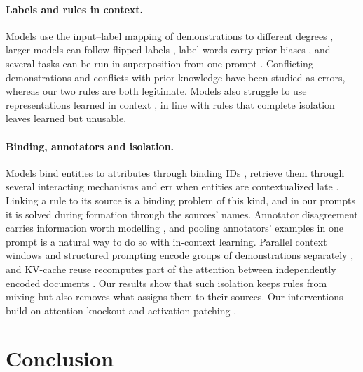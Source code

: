 \documentclass[11pt]{article}
\begin{document}
\paragraph{Labels and rules in context.}
Models use the input--label mapping of demonstrations to different degrees \citep{min-etal-2022-rethinking,kossen2024incontext}, larger models can follow flipped labels \citep{wei2023larger}, label words carry prior biases \citep{zhao2021calibrate}, and several tasks can be run in superposition from one prompt \citep{xiong2024everything,li-etal-2024-language,yang2026localizingtaskrecognitiontask}.
Conflicting demonstrations \citep{jiao2026understandingdynamicsdemonstrationconflict} and conflicts with prior knowledge \citep{li2026contextmisleadsincontextlearning} have been studied as errors, whereas our two rules are both legitimate.
Models also struggle to use representations learned in context \citep{lepori-etal-2026-language}, in line with rules that complete isolation leaves learned but unusable.

\paragraph{Binding, annotators and isolation.}
Models bind entities to attributes through binding IDs \citep{feng2024languagemodelsbindentities,dai-etal-2024-representational}, retrieve them through several interacting mechanisms \citep{gurarieh2026mixingmechanismslanguagemodels,thavarasa2026testroutelanguagemodels} and err when entities are contextualized late \citep{lepori-etal-2025-racing}. Linking a rule to its source is a binding problem of this kind, and in our prompts it is solved during formation through the sources' names.
Annotator disagreement carries information worth modelling \citep{plank-2022-problem,davani-etal-2022-dealing,santurkar2023whose}, and pooling annotators' examples in one prompt is a natural way to do so with in-context learning.
Parallel context windows and structured prompting encode groups of demonstrations separately \citep{ratner-etal-2023-parallel,hao2022structured}, and KV-cache reuse recomputes part of the attention between independently encoded documents \citep{yao2025cacheblendfastlargelanguage}. Our results show that such isolation keeps rules from mixing but also removes what assigns them to their sources.
Our interventions build on attention knockout and activation patching \citep{geva-etal-2023-dissecting,zhang2024towards}.

\section{Conclusion}
\end{document}
